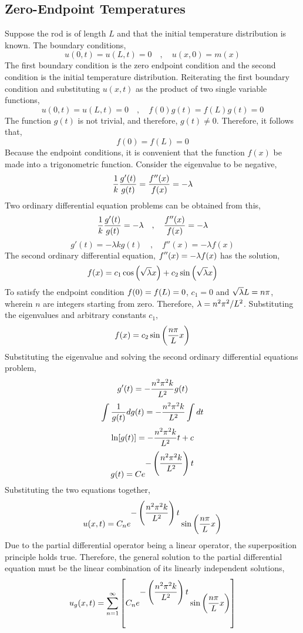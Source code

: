 \documentclass[class=report, 12pt, crop=false]{standalone}
\begin{document}
\begin{center}
\section{Zero-Endpoint Temperatures}
\begin{comment} 
\end{comment}
Suppose the rod is of length $L$ and that the initial temperature distribution is known. The boundary conditions,
$$u(0,t) = u(L,t) = 0\quad,\quad u(x,0) = m(x)$$The first boundary condition is the zero endpoint condition and the second condition is the initial temperature distribution. Reiterating the first boundary condition and substituting $u(x,t)$ as the product of two single variable functions,
$$u(0,t) = u(L,t) = 0\quad,\quad f(0)g(t) = f(L)g(t) = 0$$
The function $g(t)$ is not trivial, and therefore, $g(t) \neq 0$. Therefore, it follows that,
$$f(0) = f(L) = 0$$Because the endpoint conditions, it is convenient that the function $f(x)$ be made into a trigonometric function. Consider the eigenvalue to be negative,
$$\frac{1}{k}\frac{g'(t)}{g(t)} = \frac{f''(x)}{f(x)} = -\lambda$$
Two ordinary differential equation problems can be obtained from this,
$$\frac{1}{k}\frac{g'(t)}{g(t)} = -\lambda \quad,\quad \frac{f''(x)}{f(x)} = -\lambda$$
$$g'(t) = -\lambda kg(t) \quad,\quad f''(x) = -\lambda f(x)$$                               
The second ordinary differential equation, $\displaystyle{f''(x) = -\lambda f(x)}$ has the solution,
$$f(x) = c_1\cos\left(\sqrt{\lambda}x\right) + c_2\sin\left(\sqrt{\lambda}x\right)$$To satisfy the endpoint condition $\displaystyle{f(0) = f(L) = 0}$, $c_1 = 0$ and $\sqrt{\lambda}L = n\pi$, wherein $n$ are integers starting from zero. Therefore, $\lambda = n^2\pi^2/L^2$. Substituting the eigenvalues and arbitrary constants $c_1$,
$$f(x) = c_2\sin\left(\frac{n\pi}{L} x\right)$$
Substituting the eigenvalue and solving the second ordinary differential equations problem,
$$g'(t) = -\frac{n^2\pi^2k}{L^2}g(t)$$
$$\int\frac{1}{g(t)}dg(t) = -\frac{n^2\pi^2k}{L^2}\int dt$$
$$\ln[g(t)] = -\frac{n^2\pi^2k}{L^2}t + c$$
$$g(t) = Ce^{\displaystyle{-\left(\frac{n^2\pi^2k}{L^2}\right)t}}$$
Substituting the two equations together,
$$u(x,t) = C_ne^{\displaystyle{-\left(\frac{n^2\pi^2k}{L^2}\right)t}}\sin\left(\frac{n\pi}{L} x\right)$$
Due to the partial differential operator being a linear operator, the superposition principle holds true. Therefore, the general solution to the partial differential equation must be the linear combination of its linearly independent solutions,
$$u_g(x,t) = \sum^{\infty}_{n=1}\left[C_ne^{\displaystyle{-\left(\frac{n^2\pi^2k}{L^2}\right)t}}\sin\left(\frac{n\pi}{L} x\right)\right]$$

\end{center}
\end{document}
